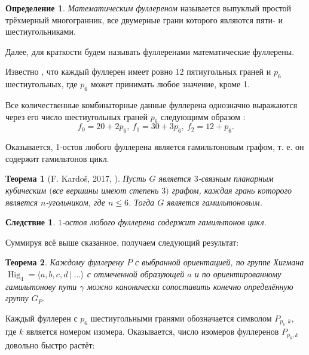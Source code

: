 \documentclass[14pt, dvipsnames, twoside]{extarticle}
\newtheorem{theorem}{Теорема}
\newtheorem{corollary}{Следствие}[theorem]
\theoremstyle{definition}
\newtheorem{defi}{Определение}
\theoremstyle{remark}
\DeclareMathOperator{\Hig}{\mathrm{Hig}}
\begin{document}
\begin{defi}
{\it Математическим фуллереном} называется выпуклый простой трёхмерный многогранник, все двумерные грани которого являются пяти- и шестиугольниками. 
\end{defi}

Далее, для краткости будем называть фуллеренами математические фуллерены.

Известно \cite{Fullerenes}, что каждый фуллерен имеет ровно 12 пятиугольных граней и $p_6$ шестиугольных, где $p_6$ может принимать любое значение, кроме 1. 

Все количественные комбинаторные данные фуллерена однозначно выражаются через его число шестиугольных граней $p_6$ следующимм образом \cite{Fullerenes}: $$f_0 = 20 + 2p_6,\ f_1 = 30 + 3p_6, \ f_2 = 12 + p_6.$$

Оказывается, 1-остов любого фуллерена является гамильтоновым графом, т. е. он содержит гамильтонов цикл.

\begin{theorem}[F. Kardo\v{s}, 2017, \cite{Kardos}]

Пусть $G$ является $3$-связным планарным кубическим $($все вершины имеют степень $3)$ графом, каждая грань которого является $n$-угольником, где $n\leqslant 6$. Тогда $G$ является гамильтоновым.

\end{theorem}
 

\begin{corollary}

$1$-остов любого фуллерена содержит гамильтонов цикл.

\end{corollary}


Суммируя всё выше сказанное, получаем следующий результат:

\begin{theorem}

Каждому фуллерену $P$ с выбранной ориентацией, по группе Хигмана $\Hig_4 = \langle a, b, c, d\ | \  ... \rangle$ с отмеченной образующей $a$ и по ориентированному гамильтонову пути $\gamma$ можно канонически сопоставить конечно определённую группу $G_P$. 

\end{theorem}





Каждый фуллерен с $p_6$ шестиугольными гранями обозначается символом $P_{p_6, k}$, где $k$ является номером изомера. Оказывается, число изомеров фуллеренов $P_{p_6, k}$ довольно быстро растёт:
\end{document}
